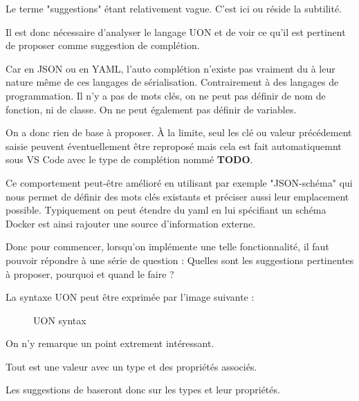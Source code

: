 \documentclass[
    iict, %
    il, %
]{heig-tb}
\begin{document}
Le terme "suggestions" étant relativement vague. C'est ici ou réside la subtilité.

Il est donc nécessaire d'analyser le langage UON et de voir ce qu'il est pertinent de proposer comme suggestion de complétion.

Car en JSON ou en YAML, l'auto complétion n'existe pas vraiment du à leur nature même de ces langages de sérialisation.
Contrairement à des langages de programmation. Il n'y a pas de mots clés, on ne peut pas définir de nom de fonction, ni de classe. On ne peut également pas définir de variables.

On a donc rien de base à proposer. À la limite, seul les clé ou valeur précédement saisie peuvent éventuellement être reproposé mais cela est fait automatiquemnt sous VS Code
avec le type de complétion nommé \textbf{TODO}.

Ce comportement peut-être amélioré en utilisant par exemple "JSON-schéma" qui nous permet de définir des mots clés existants et préciser aussi leur emplacement possible.
Typiquement on peut étendre du yaml en lui spécifiant un schéma Docker est ainsi rajouter une source d'information externe.

Donc pour commencer, lorsqu'on implémente une telle fonctionnalité, il faut pouvoir répondre à une série de question :
Quelles sont les suggestions pertinentes à proposer, pourquoi et quand le faire ?

La syntaxe UON peut être exprimée par l'image suivante :

\begin{figure}[!ht]
    \begin{center}
    \end{center}
    \caption[syntax]{\label{syntax} UON syntax}
\end{figure}

On n'y remarque un point extrement intéressant.

Tout est une valeur avec un type et des propriétés associés.

Les suggestions de baseront donc sur les types et leur propriétés.
\end{document}
